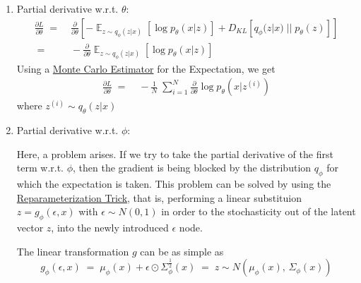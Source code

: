 \documentclass[12pt]{report}
\DeclareMathOperator{\E}{\mathbb{E}}
\begin{document}
\begin{enumerate}
    \item Partial derivative w.r.t. $\theta$:
        \begin{align*}
            \frac{\partial L}{\partial \theta}
            \;=&\; \frac{\partial}{\partial \theta} \left[
                -\E_{z \sim q_{\phi}(z | x)} \left[\log p_{\theta}(x | z) \right]
                + D_{KL}\left[q_{\phi}(z | x) \;||\; p_{\theta}(z) \right]
                 \right] \\[2ex]
            \;=&\; -\frac{\partial}{\partial \theta}
                \E_{z \sim q_{\phi}(z | x)} \left[\log p_{\theta}(x | z) \right]
        \end{align*}
        Using a \href{http://ib.berkeley.edu/labs/slatkin/eriq/classes/guest_
        lect/mc_lecture_notes.pdf}{Monte Carlo Estimator} for the Expectation,
        we get
        \begin{align*}
            \frac{\partial L}{\partial \theta}
            \;=&\; -\frac{1}{N} \;\sum_{i=1}^N \frac{\partial}{\partial \theta}
                \log p_{\theta}(x | z^{(i)})
        \end{align*}
        where $z^{(i)} \sim q_{\theta}(z | x)$

    \item Partial derivative w.r.t. $\phi$:
        \bigskip

        Here, a problem arises. If we try to take the partial derivative of the
        first term w.r.t. $\phi$, then the gradient is being blocked by the
        distribution $q_{\phi}$ for which the expectation is taken. This problem can
        be solved by using the
        \href{https://towardsdatascience.com/reparameterization-trick-126062cfd3c3}
        {Reparameterization Trick}, that is, performing a linear substituion
        $z = g_{\phi}(\epsilon, x)$ with $\epsilon \sim N(0, 1)$ in order to
         the stochasticity out of the latent vector $z$, into the
        newly introduced $\epsilon$ node.

        The linear transformation $g$ can be as simple as
        $$g_{\phi}(\epsilon, x) \;=\; \mu_{\phi}(x) +
                                      \epsilon \odot \Sigma_{\phi}^{\frac{1}{2}}(x)
                                \;=\; z \sim N(\mu_{\phi}(x),\, \Sigma_{\phi}(x))$$
\end{enumerate}
\clearpage
\end{document}
